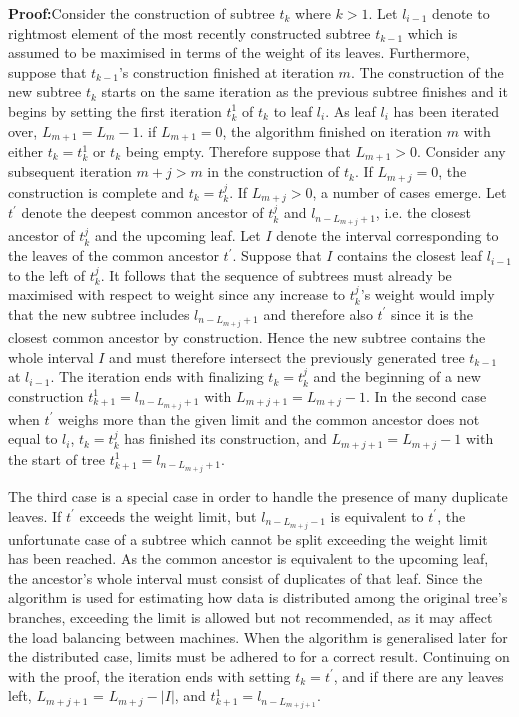 \documentclass{report}
\begin{document}
\noindent\textbf{Proof:}\quad Consider the construction of subtree $t_k$ where $k > 1$. Let $l_{i-1}$ denote to rightmost element of the most recently constructed subtree $t_{k-1}$ which
is assumed to be maximised in terms of the weight of its leaves.
Furthermore, suppose that $t_{k-1}$'s construction finished at iteration $m$.
The construction of the new subtree $t_k$ starts on the same iteration as the previous subtree finishes and it begins by
setting the first iteration $t_k^1$ of $t_k$ to leaf $l_i$. As leaf $l_i$ has been iterated over, $L_{m+1} = L_{m} - 1$.
if $L_{m+1} = 0$, the algorithm finished on iteration $m$ with either $t_k = t_k^1$ or $t_k$ being empty. Therefore suppose that $L_{m+1} > 0$.
Consider any subsequent iteration $m + j > m$ in the construction of $t_k$. If $L_{m+j} = 0$, the construction is complete and $t_k = t_k^{j}$.
If $L_{m+j} > 0$, a number of cases emerge. Let $t^\prime$ denote the deepest common ancestor of $t_k^{j}$ and $l_{n-L_{m+j}+1}$, i.e. the closest ancestor of $t_k^{j}$ and the upcoming leaf. Let $I$ denote the interval 
corresponding to the leaves of the common ancestor $t^\prime$. 
Suppose that $I$ contains the closest leaf $l_{i-1}$ to the left of $t_k^{j}$. It follows that the sequence of subtrees must already be maximised with respect to weight
since any increase to $t_k^{j}$'s weight would imply that the new subtree includes $l_{n-L_{m+j}+1}$ and therefore also $t^\prime$ since it is the closest common ancestor by construction. 
Hence the new subtree contains the whole interval $I$ and must 
therefore intersect the previously generated tree $t_{k-1}$ at $l_{i-1}$. The iteration ends with finalizing $t_k = t_{k}^{j}$ and the beginning of a new construction $t_{k+1}^1 = l_{n-L_{m+j}+1}$ with $L_{m+j+1} = L_{m+j} - 1$. 
In the second case when $t^\prime$ weighs more than the given limit and the common ancestor does not equal to $l_i$, $t_k = t_k^{j}$ has finished its construction, and 
$L_{m+j+1} = L_{m+j} - 1$ with the start of tree $t_{k+1}^1 = l_{n-L_{m+j}+1}$.

The third case is a special case in order to handle the presence of many duplicate leaves. 
If $t^\prime$ exceeds the weight limit, but $l_{n-L_{m+j}-1}$ is equivalent to $t^\prime$, the unfortunate case of a subtree which cannot be split
exceeding the weight limit has been reached. As the common ancestor
is equivalent to the upcoming leaf, the ancestor's whole interval must consist of duplicates of that leaf. Since the algorithm is used for estimating how data is distributed among the original tree's branches,
exceeding the limit is allowed but not recommended, as it may affect the load balancing between machines. When the algorithm is generalised later for the distributed case, limits must be adhered to for a correct result.
Continuing on with the proof, the iteration ends with setting $t_k = t^\prime$, and if there are any leaves left, $L_{m+j+1}$ = $L_{m+j} - |I|$, and  $t_{k+1}^1 = l_{n-L_{m+j+1}}$.
\end{document}

